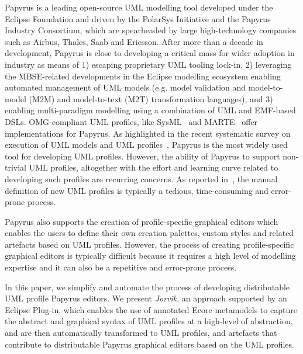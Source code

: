 Papyrus \cite{lanusse2009papyrus} is a leading open-source UML modelling tool developed under the Eclipse Foundation and driven by the PolarSys Initiative and the Papyrus Industry Consortium, which are spearheaded by large high-technology companies such as Airbus, Thales, Saab and Ericsson.  
After more than a decade in development, Papyrus is close to developing a critical mass for wider adoption in industry as means of 1) escaping proprietary UML tooling lock-in, 2) leveraging the MBSE-related developments in the Eclipse modelling ecosystem enabling automated management of UML models (e.g. model validation and model-to-model (M2M) and model-to-text (M2T) transformation languages), and 3) enabling multi-paradigm modelling using a combination of UML and EMF-based DSLs. 
OMG-compliant UML profiles, like SysML~\cite{friedenthal2014practical} and MARTE~\cite{omg2011marte} offer implementations for Papyrus. 
As highlighted in the recent systematic survey on execution of UML models and UML profiles~\cite{ciccozzi2018execution}, Papyrus is the most widely used tool for developing UML profiles.
However, the ability of Papyrus to support non-trivial UML profiles, altogether with the effort and learning curve related to developing such profiles are recurring concerns. 
As reported in~\cite{Wimmer2009:IJWIS}, the manual definition of new UML profiles is typically a tedious, time-consuming and error-prone process.

Papyrus also supports the creation of profile-specific graphical editors which enables the users to define their own creation palettes, custom styles and related artefacts based on UML profiles. 
However, the process of creating profile-specific graphical editors is typically difficult because it requires a high level of modelling expertise and it can also be a repetitive and error-prone process.

In this paper, we simplify and automate the process of developing distributable UML profile Papyrus editors. 
We present \textit{Jorvik}, an approach supported by an Eclipse Plug-in, which enables the use of annotated Ecore metamodels to capture the abstract and graphical syntax of UML profiles at a high-level of abstraction, and are then automatically transformed to UML profiles, and artefacts that contribute to distributable Papyrus graphical editors based on the UML profiles. 


